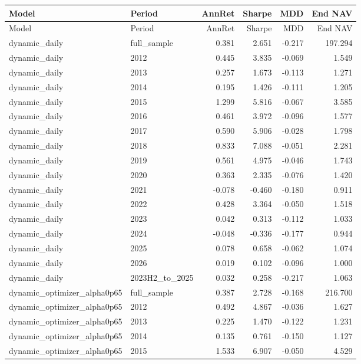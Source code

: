\scriptsize
\setlength{\tabcolsep}{2pt}
\begin{longtable}{llrrrr}
\toprule
Model & Period & AnnRet & Sharpe & MDD & End NAV \\
\midrule
\endfirsthead
\toprule
Model & Period & AnnRet & Sharpe & MDD & End NAV \\
\midrule
\endhead
dynamic\_daily & full\_sample & 0.381 & 2.651 & -0.217 & 197.294 \\
dynamic\_daily & 2012 & 0.445 & 3.835 & -0.069 & 1.549 \\
dynamic\_daily & 2013 & 0.257 & 1.673 & -0.113 & 1.271 \\
dynamic\_daily & 2014 & 0.195 & 1.426 & -0.111 & 1.205 \\
dynamic\_daily & 2015 & 1.299 & 5.816 & -0.067 & 3.585 \\
dynamic\_daily & 2016 & 0.461 & 3.972 & -0.096 & 1.577 \\
dynamic\_daily & 2017 & 0.590 & 5.906 & -0.028 & 1.798 \\
dynamic\_daily & 2018 & 0.833 & 7.088 & -0.051 & 2.281 \\
dynamic\_daily & 2019 & 0.561 & 4.975 & -0.046 & 1.743 \\
dynamic\_daily & 2020 & 0.363 & 2.335 & -0.076 & 1.420 \\
dynamic\_daily & 2021 & -0.078 & -0.460 & -0.180 & 0.911 \\
dynamic\_daily & 2022 & 0.428 & 3.364 & -0.050 & 1.518 \\
dynamic\_daily & 2023 & 0.042 & 0.313 & -0.112 & 1.033 \\
dynamic\_daily & 2024 & -0.048 & -0.336 & -0.177 & 0.944 \\
dynamic\_daily & 2025 & 0.078 & 0.658 & -0.062 & 1.074 \\
dynamic\_daily & 2026 & 0.019 & 0.102 & -0.096 & 1.000 \\
dynamic\_daily & 2023H2\_to\_2025 & 0.032 & 0.258 & -0.217 & 1.063 \\
dynamic\_optimizer\_alpha0p65 & full\_sample & 0.387 & 2.728 & -0.168 & 216.700 \\
dynamic\_optimizer\_alpha0p65 & 2012 & 0.492 & 4.867 & -0.036 & 1.627 \\
dynamic\_optimizer\_alpha0p65 & 2013 & 0.225 & 1.470 & -0.122 & 1.231 \\
dynamic\_optimizer\_alpha0p65 & 2014 & 0.135 & 0.761 & -0.150 & 1.127 \\
dynamic\_optimizer\_alpha0p65 & 2015 & 1.533 & 6.907 & -0.050 & 4.529 \\

\end{longtable}
